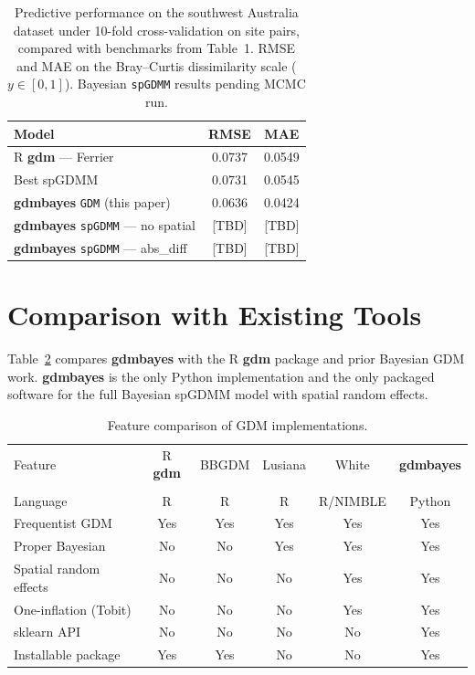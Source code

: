 \documentclass[12pt,a4paper]{article}
\begin{document}
\begin{table}[h]
  \centering
  \caption{Predictive performance on the southwest Australia dataset under
    10-fold cross-validation on site pairs, compared with benchmarks from
    \citet{white2024} Table~1. RMSE and MAE on the Bray--Curtis dissimilarity
    scale ($y \in [0,1]$). Bayesian \texttt{spGDMM} results pending MCMC run.}
  \label{tab:benchmark}
  \begin{tabular}{lcc}
    \toprule
    Model & RMSE & MAE \\
    \midrule
    R \textbf{gdm} --- Ferrier \citep{white2024}     & 0.0737 & 0.0549 \\
    Best spGDMM \citep{white2024}                     & 0.0731 & 0.0545 \\
    \textbf{gdmbayes} \texttt{GDM} (this paper)      & 0.0636 & 0.0424 \\
    \textbf{gdmbayes} \texttt{spGDMM} --- no spatial & [TBD]  & [TBD]  \\
    \textbf{gdmbayes} \texttt{spGDMM} --- abs\_diff  & [TBD]  & [TBD]  \\
    \bottomrule
  \end{tabular}
\end{table}

\section{Comparison with Existing Tools}\label{sec:comparison}

Table~\ref{tab:comparison} compares \textbf{gdmbayes} with the R
\textbf{gdm} package \citep{fitzpatrick2021} and prior Bayesian GDM work.
\textbf{gdmbayes} is the only Python implementation and the only packaged
software for the full Bayesian spGDMM model with spatial random effects.

\begin{table}[h]
  \centering
  \caption{Feature comparison of GDM implementations.\label{tab:comparison}}
  \begin{tabular}{lccccc}
    \toprule
    Feature & R \textbf{gdm} & BBGDM & Lusiana & White & \textbf{gdmbayes} \\
            & \citep{fitzpatrick2021} & \citep{woolley2017} &
              \citep{lusiana2023} & \citep{white2024} & \\
    \midrule
    Language               & R   & R   & R  & R/NIMBLE & Python \\
    Frequentist GDM        & Yes & Yes & Yes & Yes     & Yes    \\
    Proper Bayesian        & No  & No  & Yes & Yes     & Yes    \\
    Spatial random effects & No  & No  & No  & Yes     & Yes    \\
    One-inflation (Tobit)  & No  & No  & No  & Yes     & Yes    \\
    sklearn API            & No  & No  & No  & No      & Yes    \\
    Installable package    & Yes & Yes & No  & No      & Yes    \\
    \bottomrule
  \end{tabular}
\end{table}
\end{document}
